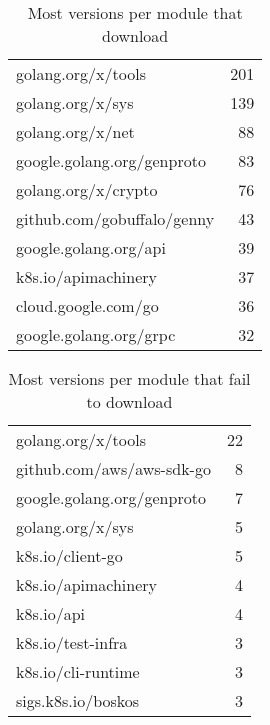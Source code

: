 \begin{table}[ht]
\caption{Most versions per module that  download}
\label{table:versions}
\begin{tabular}{|l|r|}
\hline
 golang.org/x/tools & 201 \\
 golang.org/x/sys & 139 \\
 golang.org/x/net & 88 \\
 google.golang.org/genproto & 83 \\
 golang.org/x/crypto & 76 \\
 github.com/gobuffalo/genny & 43 \\
 google.golang.org/api & 39 \\
 k8s.io/apimachinery & 37 \\
 cloud.google.com/go & 36 \\
 google.golang.org/grpc & 32 \\
\hline
\end{tabular}
\end{table}
\begin{table}[ht]
\caption{Most versions per module that fail to download}
\label{table:failversions}
\begin{tabular}{|l|r|}
\hline
 golang.org/x/tools & 22 \\
 github.com/aws/aws-sdk-go & 8 \\
 google.golang.org/genproto & 7 \\
 golang.org/x/sys & 5 \\
 k8s.io/client-go & 5 \\
 k8s.io/apimachinery & 4 \\
 k8s.io/api & 4 \\
 k8s.io/test-infra & 3 \\
 k8s.io/cli-runtime & 3 \\
 sigs.k8s.io/boskos & 3 \\
\hline
\end{tabular}
\end{table}
